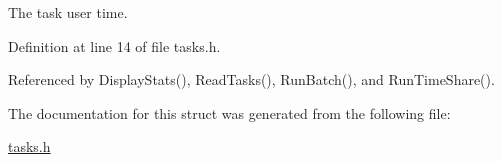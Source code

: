 The task user time. 



Definition at line 14 of file tasks.\-h.



Referenced by Display\-Stats(), Read\-Tasks(), Run\-Batch(), and Run\-Time\-Share().



The documentation for this struct was generated from the following file\-:\begin{DoxyCompactItemize}
\item 
\hyperlink{tasks_8h}{tasks.\-h}\end{DoxyCompactItemize}
